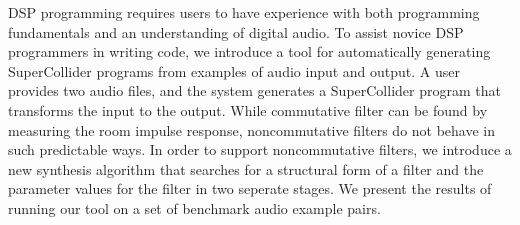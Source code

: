 DSP programming requires users to have experience with both programming fundamentals and an understanding of digital audio.
To assist novice DSP programmers in writing code, we introduce a tool for automatically generating SuperCollider programs from examples of audio input and output.
A user provides two audio files, and the system generates a SuperCollider program that transforms the input to the output.
While commutative filter can be found by measuring the room impulse response, noncommutative filters do not behave in such predictable ways.
In order to support noncommutative filters, we introduce a new synthesis algorithm that searches for a structural form of a filter and the parameter values for the filter in two seperate stages.
We present the results of running our tool on a set of benchmark audio example pairs.
